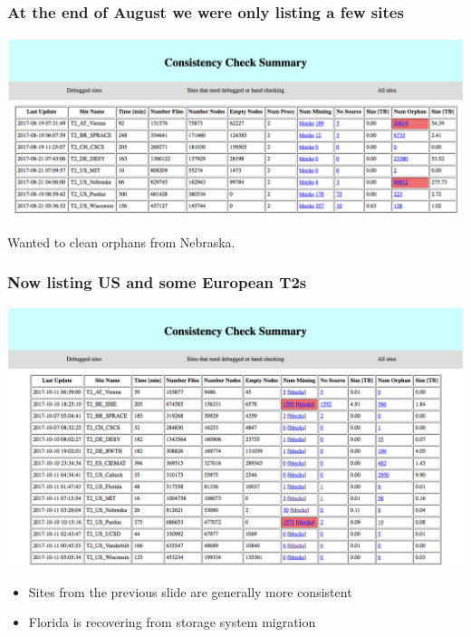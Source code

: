 \documentclass{beamer}
\begin{document}
\begin{frame}
  \frametitle{At the end of August we were only listing a few sites}

  \includegraphics[width=\linewidth]{first_screenshot.png}

  Wanted to clean orphans from Nebraska.

\end{frame}

\begin{frame}
  \frametitle{Now listing US and some European T2s}

  \includegraphics[width=\linewidth]{new_screenshot.png}

  \begin{itemize}
  \item Sites from the previous slide are generally more consistent
  \item Florida is recovering from storage system migration
  \end{itemize}

\end{frame}
\end{document}
